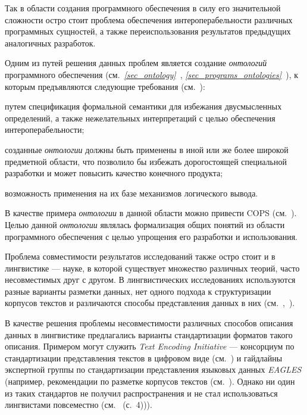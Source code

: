 Так в области создания программного обеспечения в силу его значительной сложности остро стоит проблема обеспечения интероперабельности различных программных сущностей, а также переиспользования результатов предыдущих аналогичных разработок.

Одним из путей решения данных проблем является создание \textit{онтологий} программного обеспечения (см.~\textit{\ref{sec_ontology}~}, \textit{\ref{sec_programs_ontologies}~}), к которым предъявляются следующие требования (см.~):
\begin{textitemize}
    \item путем спецификация формальной семантики для избежания двусмысленных определений, а также нежелательных интерпретаций с целью обеспечения интероперабельности;
    \item созданные \textit{онтологии} должны быть применены в иной или же более широкой предметной области, что позволило бы избежать дорогостоящей специальной разработки и может повысить качество конечного продукта;
    \item возможность применения на их базе механизмов логического вывода.
\end{textitemize}

В качестве примера \textit{онтологии} в данной области можно привести COPS (см.~).
Целью данной \textit{онтологии} являлась формализация общих понятий из области программного обеспечения с целью упрощения его разработки и использования.

Проблема совместимости результатов исследований также остро стоит и в лингвистике --- науке, в которой существует множество различных теорий, часто несовместимых друг с другом.
В лингвистических исследованиях используются разные варианты разметки данных, нет одного подхода к структуризации корпусов текстов и различаются способы представления данных в них (см.~,~).

В качестве решения проблемы несовместимости различных способов описания данных в лингвистике предлагались варианты стандартизации форматов такого описания.
Примером могут служить \textit{Text Encoding Initiative} --- консорциум по стандартизации представления текстов в цифровом виде (см.~) и гайдлайны экспертной группы по стандартизации представления языковых данных \textit{EAGLES} (например, рекомендации по разметке корпусов текстов (см.~).
Однако ни один из таких стандартов не получил распространения и не стал использоваться лингвистами повсеместно (см.~ (с.~4))).

